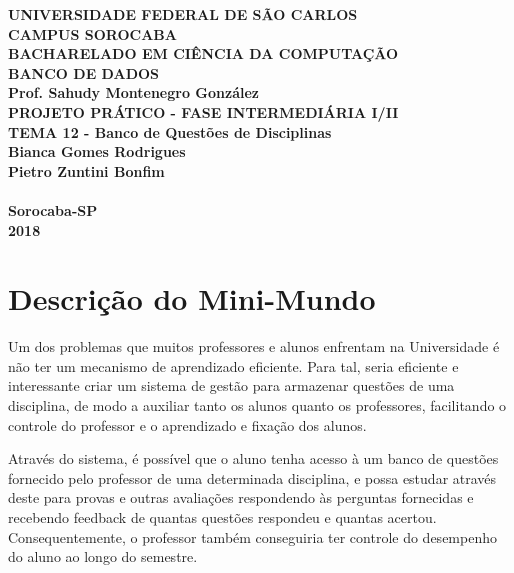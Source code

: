 \documentclass[12pt,a4paper]{article}
\begin{document}
\begin{titlepage}

\begin{center}

\textbf{UNIVERSIDADE FEDERAL DE SÃO CARLOS\\CAMPUS SOROCABA\\\vspace{3cm} BACHARELADO EM CIÊNCIA DA COMPUTAÇÃO\\\vspace{3cm}BANCO DE DADOS\\
Prof. Sahudy Montenegro González\\\vspace{3cm}
PROJETO PRÁTICO - FASE INTERMEDIÁRIA I/II\\\vspace{0.5cm}
TEMA 12 - Banco de Questões de Disciplinas\\\vspace{4.0cm}
Bianca Gomes Rodrigues\\
Pietro Zuntini Bonfim\\
\\\vspace{4cm}
Sorocaba-SP\\2018}

\end{center}

\end{titlepage}

\pagebreak
\renewcommand*\contentsname{Índice}
\tableofcontents
\pagebreak

\section{Descrição do Mini-Mundo}

Um dos problemas que muitos professores e alunos enfrentam na Universidade é não ter um mecanismo de aprendizado eficiente. Para tal, seria eficiente e interessante criar um sistema de gestão para armazenar questões de uma disciplina, de modo a auxiliar tanto os alunos quanto os professores, facilitando o controle do professor e o aprendizado e fixação dos alunos.\par
Através do sistema, é possível que o aluno tenha acesso à um banco de questões fornecido pelo professor de uma determinada disciplina, e possa estudar através deste para provas e outras avaliações respondendo às perguntas fornecidas e recebendo feedback de quantas questões respondeu e quantas acertou. Consequentemente, o professor também conseguiria ter controle do desempenho do aluno ao longo do semestre.\par
\end{document}
